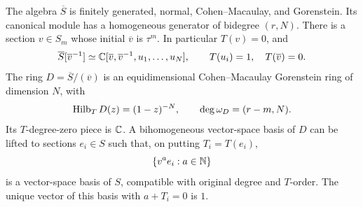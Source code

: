 \begin{lemma}\label{filt:first-ring}
The algebra $\overline S$ is finitely generated, normal, Cohen--Macaulay,
and Gorenstein.  Its canonical module has a homogeneous generator of
bidegree $(r,N)$.  There is a section $v\in S_m$ whose initial
$\overline v$ is $\tau^m$.  In particular $T(v)=0$, and
\begin{equation}\label{filt:laurent-product}
 \overline S[\overline v^{-1}]
 \simeq \mathbb C[\overline v,\overline v^{-1},u_1,\ldots,u_N],
 \qquad T(u_i)=1,\quad T(\overline v)=0.
\end{equation}
The ring $D=\overline S/(\overline v)$ is an equidimensional
Cohen--Macaulay Gorenstein ring of dimension $N$, with
\begin{equation}\label{filt:D-series}
 \operatorname{Hilb}_T D(z)=(1-z)^{-N},
 \qquad \deg\omega_D=(r-m,N).
\end{equation}
Its $T$-degree-zero piece is $\mathbb C$.  A bihomogeneous vector-space basis of
$D$ can be lifted to sections $e_i\in S$ such that, on putting $T_i=T(e_i)$,
\begin{equation}\label{filt:S-basis}
 \{v^a e_i:a\in\mathbb N\}
\end{equation}
is a vector-space basis of $S$, compatible with original degree and
$T$-order.  The unique vector of this basis with $a+T_i=0$ is $1$.
\end{lemma}


